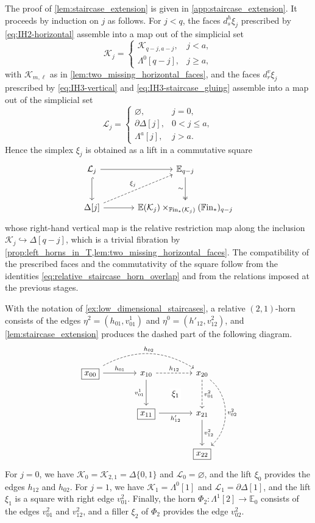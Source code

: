 \documentclass[10pt,reqno]{amsart}
\begin{document}
The proof of \cref{lem:staircase_extension} is given in
\cref{app:staircase_extension}. It proceeds by induction on $j$ as
follows. For $j<q$, the faces $d_s^h\xi_j$ prescribed by
\eqref{eq:IH2-horizontal} assemble into a map out of the simplicial
set
\[
\mathcal K_j=
\begin{cases}
\mathcal K_{q-j,a-j}, & j<a,\\
\Lambda^0[q-j], & j\geq a,
\end{cases}
\]
with $\mathcal K_{m,\ell}$ as in
\cref{lem:two_missing_horizontal_faces}, and the faces
$d_r^v\xi_j$ prescribed by \eqref{eq:IH3-vertical} and
\eqref{eq:IH3-staircase_gluing} assemble into a map out of the
simplicial set
\[
\mathcal L_j=
\begin{cases}
\varnothing, & j=0,\\
\partial\Delta[j], & 0<j\leq a,\\
\Lambda^a[j], & j>a.
\end{cases}
\]
Hence the simplex $\xi_j$ is obtained as a lift in a commutative
square
\[
\begin{tikzcd}[sep=large]
  \mathcal L_j \ar[r] \ar[d,hook] &
  \mathbb E_{q-j} \ar[d,two heads,"\sim"'] \\
  \Delta[j] \ar[r] \ar[ru,dashed,"\xi_j"] &
  \mathbb E(\mathcal K_j)\times_{\bisimFin(\mathcal K_j)}(\bisimFin)_{q-j}
\end{tikzcd}
\]
whose right-hand vertical map is the relative restriction map along
the inclusion $\mathcal K_j\hookrightarrow\Delta[q-j]$, which is a
trivial fibration by
\cref{prop:left_horns_in_T,lem:two_missing_horizontal_faces}. The
compatibility of the prescribed faces and the commutativity of the
square follow from the identities
\eqref{eq:relative_staircase_horn_overlap} and from the relations
imposed at the previous stages.

\begin{ex}
\label{ex:staircase_horns_degree_two}
With the notation of \cref{ex:low_dimensional_staircases}, a relative
$(2,1)$-horn consists of the edges $\eta^2=(h_{01},v^1_{01})$ and
$\eta^0=(h'_{12},v^2_{12})$, and \cref{lem:staircase_extension}
produces the dashed part of the following diagram.
\[
\begin{tikzcd}[ampersand replacement=\&, sep=large]
\boxed{x_{00}}\arrow[r,"h_{01}"]\arrow[rr,bend left=30,dashed,"h_{02}"]
\&x_{10}\arrow[r,dashed,"h_{12}"]\arrow[d,"v^1_{01}"']
 \arrow[dr,phantom,"\xi_1" description]
\&x_{20}\arrow[d,dashed,"v^2_{01}"]
 \arrow[dd,bend left=50,dashed,"v^2_{02}"]\\
\&\boxed{x_{11}}\arrow[r,"h'_{12}"']\&x_{21}\arrow[d,"v^2_{12}"]\\
\&\&\boxed{x_{22}}
\end{tikzcd}
\]
For $j=0$, we have
$\mathcal K_0=\mathcal K_{2,1}=\Delta\{0,1\}$ and
$\mathcal L_0=\varnothing$, and the lift $\xi_0$ provides the edges
$h_{12}$ and $h_{02}$. For $j=1$, we have
$\mathcal K_1=\Lambda^0[1]$ and $\mathcal L_1=\partial\Delta[1]$,
and the lift $\xi_1$ is a square with right edge $v^2_{01}$.
Finally, the horn $\Phi_2:\Lambda^1[2]\to\mathbb E_0$ consists of the
edges $v^2_{01}$ and $v^2_{12}$, and a filler $\xi_2$ of
$\Phi_2$ provides the edge $v^2_{02}$.
\end{ex}
\end{document}
